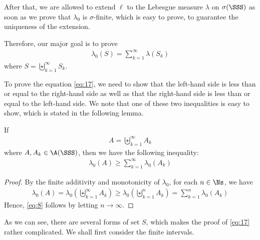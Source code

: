\documentclass[thmcnt=section, 12pt]{elegantbook}
\begin{document}
\par After that, we are allowed to extend $\ell$ to the Lebesgue measure $\lambda$ on $\sigma(\SSS)$ as soon as we prove that $\lambda_0$ is $\sigma$-finite, which is easy to prove, to guarantee the uniqueness of the extension.

\par Therefore, our major goal is to prove 
\begin{align}
    \lambda_0(S) = \sum_{k=1}^\infty \lambda(S_k)
    \label{eq:17}
\end{align}
where $S = \biguplus_{k=1}^\infty S_k$.


\par To prove the equation \eqref{eq:17}, we need to show that the left-hand side is less than or equal to the right-hand side as well as that the right-hand side is less than or equal to the left-hand side. We note that one of these two inequalities is easy to show, which is stated in the following lemma.

\begin{lemma} \label{lem:2}
    If
    \begin{align*}
        A = \biguplus_{k=1}^\infty A_k
    \end{align*}
    where $A, A_k \in \A(\SSS)$, then we have the following inequality:
    \begin{align}
        \lambda_0(A) \geq \sum_{k=1}^\infty \lambda_0(A_k) 
        \label{eq:8}
    \end{align}
\end{lemma}

\begin{proof}
    By the finite additivity and monotonicity of $\lambda_0$, for each $n \in \Ns$, we have 
    \begin{align*}
        \lambda_0(A)
        = \lambda_0\left(\biguplus_{k=1}^\infty A_k\right)
        \geq \lambda_0\left(\biguplus_{k=1}^n A_k\right)
        = \sum_{k=1}^n \lambda_0(A_k)
    \end{align*}
    Hence, \eqref{eq:8} follows by letting $n \to \infty$.
\end{proof}


\par As we can see, there are several forms of set $S$, which makes the proof of \eqref{eq:17} rather complicated. We shall first consider the finite intervals. 
\end{document}
